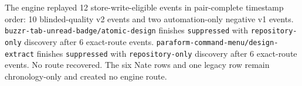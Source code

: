 The engine replayed 12 store-write-eligible events in pair-complete timestamp order: 10 blinded-quality v2 events and two automation-only negative v1 events. \texttt{buzzr-tab-unread-badge/atomic-design} finishes \texttt{suppressed} with \texttt{repository-only} discovery after 6 exact-route events. \texttt{paraform-command-menu/design-extract} finishes \texttt{suppressed} with \texttt{repository-only} discovery after 6 exact-route events. No route recovered. The six Nate rows and one legacy row remain chronology-only and created no engine route.
